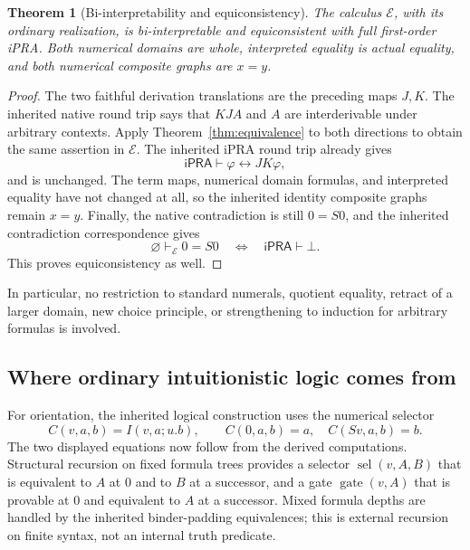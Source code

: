 \documentclass[11pt]{article}
\newtheorem{theorem}{Theorem}[section]
\theoremstyle{definition}
\newcommand{\E}{\mathcal E}
\newcommand{\ipra}{\mathsf{iPRA}}
\begin{document}
\begin{theorem}[Bi-interpretability and equiconsistency]
The calculus $\E$, with its ordinary realization, is bi-interpretable
and equiconsistent with full first-order iPRA. Both numerical domains
are whole, interpreted equality is actual equality, and both numerical
composite graphs are $x=y$.
\end{theorem}
\begin{proof}
The two faithful derivation translations are the preceding maps $J,K$.
The inherited native round trip says that $KJA$ and $A$ are interderivable
under arbitrary contexts. Apply Theorem~\ref{thm:equivalence} to both
directions to obtain the same assertion in $\E$. The inherited iPRA
round trip already gives
\[
 \ipra\vdash\varphi\leftrightarrow JK\varphi,
\]
and is unchanged. The term maps, numerical domain formulas, and interpreted
equality have not changed at all, so the inherited identity composite
graphs remain $x=y$. Finally, the native contradiction is still $0=S0$,
and the inherited contradiction correspondence gives
\[
 \varnothing\vdash_\E 0=S0
 \quad\Longleftrightarrow\quad
 \ipra\vdash\bot.
\]
This proves equiconsistency as well.
\end{proof}

In particular, no restriction to standard numerals, quotient equality,
retract of a larger domain, new choice principle, or strengthening to
induction for arbitrary formulas is involved.

\subsection{Where ordinary intuitionistic logic comes from}

For orientation, the inherited logical construction uses the numerical
selector
\[
 C(v,a,b)=I(v,a;u.b),\qquad
 C(0,a,b)=a,\quad C(Sv,a,b)=b.
\]
The two displayed equations now follow from the derived computations.
Structural recursion on fixed formula trees provides a selector
$\operatorname{sel}(v,A,B)$ that is equivalent to $A$ at $0$ and to $B$
at a successor, and a gate $\operatorname{gate}(v,A)$ that is provable
at $0$ and equivalent to $A$ at a successor. Mixed formula depths are
handled by the inherited binder-padding equivalences; this is external
recursion on finite syntax, not an internal truth predicate.
\end{document}
